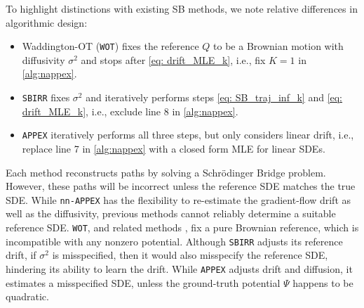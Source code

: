 \documentclass[twoside]{article}
\newcommand{\nappex}{\texttt{nn-APPEX}}
\newcommand{\appex}{\texttt{APPEX}}
\newcommand{\wot}{\texttt{WOT}}
\newcommand{\sbirr}{\texttt{SBIRR}}
\begin{document}
To highlight distinctions with existing SB methods, we note relative differences in algorithmic design:
\begin{itemize}
    \item Waddington-OT (\wot) \citep{schiebinger2019optimal} fixes the reference $Q$ to be a Brownian motion with diffusivity $\sigma^2$ and stops  after \eqref{eq: drift_MLE_k}, i.e., fix $K=1$ in \cref{alg:nappex}.
    \item \sbirr{} \citep{shen2025multi,zhang2024joint} fixes $\sigma^2$ and iteratively performs steps \eqref{eq: SB_traj_inf_k} and \eqref{eq: drift_MLE_k}, i.e., exclude line 8 in \cref{alg:nappex}.
    \item \appex{} \citep{guan2024identifying} iteratively performs all three steps, but only considers linear drift, i.e., replace line 7 in \cref{alg:nappex} with a closed form MLE for linear SDEs.
\end{itemize}
Each method reconstructs paths by solving a Schr\"odinger Bridge problem. However, these paths will be incorrect unless the reference SDE matches the true SDE. While \nappex{} has the flexibility to re-estimate the gradient-flow drift as well as the diffusivity, previous methods cannot reliably determine a suitable reference SDE. \wot{}, and related methods \citep{lavenant2021towards, forrow2021lineageot, chizat2022trajectory}, fix a pure Brownian reference, which is incompatible with any nonzero potential. Although \sbirr{} adjusts its reference drift, if $\sigma^2$ is misspecified, then it would also misspecify the reference SDE, hindering its ability to learn the drift. While \appex{} adjusts drift and diffusion, it estimates a misspecified SDE, unless the ground-truth potential $\Psi$ happens to be quadratic.





\end{document}
